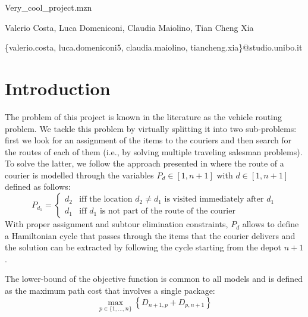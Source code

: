 \documentclass{article}
\begin{document}
    \begin{titlepage}
        \begin{center}
            {\LARGE Very\_cool\_project.mzn}
            \vspace*{1em}
            
            Valerio Costa, Luca Domeniconi, Claudia Maiolino, Tian Cheng Xia

            \centerline{\{valerio.costa, luca.domeniconi5, claudia.maiolino, tiancheng.xia\}@studio.unibo.it}
        \end{center}
    \end{titlepage}


    \section{Introduction} \label{sec:intro}
    The problem of this project is known in the literature as the vehicle routing problem. We tackle this problem by virtually splitting it into two sub-problems: first we look for an assignment of the items to the couriers and then search for the routes of each of them (i.e., by solving multiple traveling salesman problems). To solve the latter, we follow the approach presented in \cite{vrp} where the route of a courier is modelled through the variables $P_d \in [1, n+1]$ with $d \in [1, n+1]$ defined as follows:
    \begin{equation}
        \label{eq:path_def}
        P_{d_1} = \begin{cases}
            d_2 & \text{iff the location $d_2 \neq d_1$ is visited immediately after $d_1$}\\
            d_1 & \text{iff $d_1$ is not part of the route of the courier}
        \end{cases}
    \end{equation} 
    With proper assignment and subtour elimination constraints, $P_d$ allows to define a Hamiltonian cycle that passes through the items that the courier delivers and the solution can be extracted by following the cycle starting from the depot $n+1$.

    The lower-bound of the objective function is common to all models and is defined as the maximum path cost that involves a single package:
    \begin{equation}
        \max_{p \in \{ 1, \dots, n \}} \left\{ D_{n+1, p} + D_{p, n+1} \right\}
    \end{equation}
\end{document}
